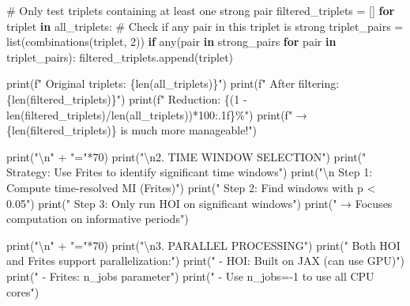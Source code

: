 \documentclass[
  11pt,
  letterpaper,
  oneside,
  openany]{book}
\newenvironment{Shaded}{\begin{snugshade}}{\end{snugshade}}
\newcommand{\BuiltInTok}[1]{\textcolor[rgb]{0.00,0.23,0.31}{#1}}
\newcommand{\CharTok}[1]{\textcolor[rgb]{0.13,0.47,0.30}{#1}}
\newcommand{\CommentTok}[1]{\textcolor[rgb]{0.37,0.37,0.37}{#1}}
\newcommand{\ControlFlowTok}[1]{\textcolor[rgb]{0.00,0.23,0.31}{\textbf{#1}}}
\newcommand{\DecValTok}[1]{\textcolor[rgb]{0.68,0.00,0.00}{#1}}
\newcommand{\KeywordTok}[1]{\textcolor[rgb]{0.00,0.23,0.31}{\textbf{#1}}}
\newcommand{\NormalTok}[1]{\textcolor[rgb]{0.00,0.23,0.31}{#1}}
\newcommand{\OperatorTok}[1]{\textcolor[rgb]{0.37,0.37,0.37}{#1}}
\newcommand{\SpecialCharTok}[1]{\textcolor[rgb]{0.37,0.37,0.37}{#1}}
\newcommand{\SpecialStringTok}[1]{\textcolor[rgb]{0.13,0.47,0.30}{#1}}
\newcommand{\StringTok}[1]{\textcolor[rgb]{0.13,0.47,0.30}{#1}}
\begin{document}
\begin{Shaded}
\begin{Highlighting}[]
\CommentTok{\# Only test triplets containing at least one strong pair}
\NormalTok{filtered\_triplets }\OperatorTok{=}\NormalTok{ []}
\ControlFlowTok{for}\NormalTok{ triplet }\KeywordTok{in}\NormalTok{ all\_triplets:}
    \CommentTok{\# Check if any pair in this triplet is strong}
\NormalTok{    triplet\_pairs }\OperatorTok{=} \BuiltInTok{list}\NormalTok{(combinations(triplet, }\DecValTok{2}\NormalTok{))}
    \ControlFlowTok{if} \BuiltInTok{any}\NormalTok{(pair }\KeywordTok{in}\NormalTok{ strong\_pairs }\ControlFlowTok{for}\NormalTok{ pair }\KeywordTok{in}\NormalTok{ triplet\_pairs):}
\NormalTok{        filtered\_triplets.append(triplet)}

\BuiltInTok{print}\NormalTok{(}\SpecialStringTok{f"   Original triplets: }\SpecialCharTok{\{}\BuiltInTok{len}\NormalTok{(all\_triplets)}\SpecialCharTok{\}}\SpecialStringTok{"}\NormalTok{)}
\BuiltInTok{print}\NormalTok{(}\SpecialStringTok{f"   After filtering: }\SpecialCharTok{\{}\BuiltInTok{len}\NormalTok{(filtered\_triplets)}\SpecialCharTok{\}}\SpecialStringTok{"}\NormalTok{)}
\BuiltInTok{print}\NormalTok{(}\SpecialStringTok{f"   Reduction: }\SpecialCharTok{\{}\NormalTok{(}\DecValTok{1} \OperatorTok{{-}} \BuiltInTok{len}\NormalTok{(filtered\_triplets)}\OperatorTok{/}\BuiltInTok{len}\NormalTok{(all\_triplets))}\OperatorTok{*}\DecValTok{100}\SpecialCharTok{:.1f\}}\SpecialStringTok{\%"}\NormalTok{)}
\BuiltInTok{print}\NormalTok{(}\SpecialStringTok{f"   → }\SpecialCharTok{\{}\BuiltInTok{len}\NormalTok{(filtered\_triplets)}\SpecialCharTok{\}}\SpecialStringTok{ is much more manageable!"}\NormalTok{)}

\BuiltInTok{print}\NormalTok{(}\StringTok{"}\CharTok{\textbackslash{}n}\StringTok{"} \OperatorTok{+} \StringTok{"="}\OperatorTok{*}\DecValTok{70}\NormalTok{)}
\BuiltInTok{print}\NormalTok{(}\StringTok{"}\CharTok{\textbackslash{}n}\StringTok{2. TIME WINDOW SELECTION"}\NormalTok{)}
\BuiltInTok{print}\NormalTok{(}\StringTok{"   Strategy: Use Frites to identify significant time windows"}\NormalTok{)}
\BuiltInTok{print}\NormalTok{(}\StringTok{"}\CharTok{\textbackslash{}n}\StringTok{   Step 1: Compute time{-}resolved MI (Frites)"}\NormalTok{)}
\BuiltInTok{print}\NormalTok{(}\StringTok{"   Step 2: Find windows with p \textless{} 0.05"}\NormalTok{)}
\BuiltInTok{print}\NormalTok{(}\StringTok{"   Step 3: Only run HOI on significant windows"}\NormalTok{)}
\BuiltInTok{print}\NormalTok{(}\StringTok{"   → Focuses computation on informative periods"}\NormalTok{)}

\BuiltInTok{print}\NormalTok{(}\StringTok{"}\CharTok{\textbackslash{}n}\StringTok{"} \OperatorTok{+} \StringTok{"="}\OperatorTok{*}\DecValTok{70}\NormalTok{)}
\BuiltInTok{print}\NormalTok{(}\StringTok{"}\CharTok{\textbackslash{}n}\StringTok{3. PARALLEL PROCESSING"}\NormalTok{)}
\BuiltInTok{print}\NormalTok{(}\StringTok{"   Both HOI and Frites support parallelization:"}\NormalTok{)}
\BuiltInTok{print}\NormalTok{(}\StringTok{"   {-} HOI: Built on JAX (can use GPU)"}\NormalTok{)}
\BuiltInTok{print}\NormalTok{(}\StringTok{"   {-} Frites: n\_jobs parameter"}\NormalTok{)}
\BuiltInTok{print}\NormalTok{(}\StringTok{"   {-} Use n\_jobs={-}1 to use all CPU cores"}\NormalTok{)}


\end{Highlighting}
\end{Shaded}
\end{document}
